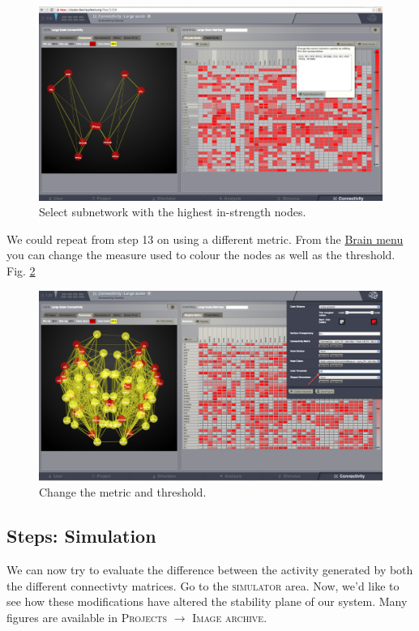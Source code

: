 \documentclass{tufte-handout}
\begin{document}
\begin{figure}[h]
  \includegraphics[width=0.9\linewidth]{Handout_UI_ModellingStructuralLesions_SelectSubnetwork}%
  \caption{Select subnetwork with the highest in-strength nodes.}%
  \label{fig:step_subnetwork}%
\end{figure}
\newpage


We could repeat from step 13 on using a different metric. From the \underline{Brain menu}
 you can change the measure used to colour the nodes as well as the threshold. Fig. \ref{fig:step_change_threshold}

\begin{figure}[h]
  \includegraphics[width=0.9\linewidth]{Handout_UI_ModellingStructuralLesions_ChangeNodeColourThreshold}%
  \caption{Change the metric and threshold.}%
  \label{fig:step_change_threshold}%
\end{figure}
\newpage

\subsection{Steps: Simulation}

\noindent We can now try to evaluate the difference between the activity generated by both the different connectivty matrices. 
Go to the \textsc{simulator} area. Now, we'd like to see how these modifications have altered the stability plane
of our system. Many figures are available in \textsc{Projects} $\rightarrow$ \textsc{Image archive}.
\end{document}
